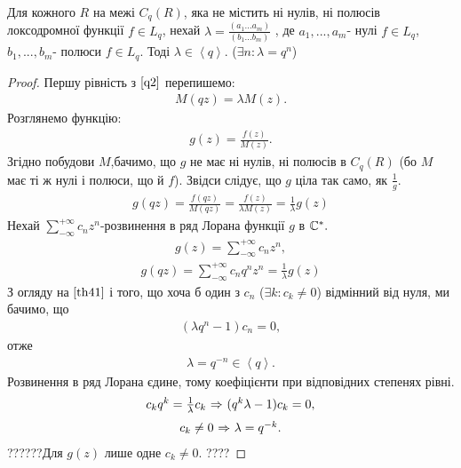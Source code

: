 \documentclass[12pt,a4paper]{article}
\begin{document}
\begin{thm}
Для кожного $R$ на межі $C_{q}(R)$, яка не містить ні нулів, ні полюсів локсодромної функції $f\in L_{q}$, нехай $\lambda=\frac{(a_{1}...a_{m})}{(b_{1}...b_{m})}$ , де $a_{1},...,a_{m}$- нулі $f\in L_{q}$, $b_{1},...,b_{m}$- полюси $f\in L_{q}$. Тоді $\lambda\in \left \langle q \right \rangle$. ($ \exists n:\lambda =q^{n}$)
\end{thm}
\begin{proof}
Першу рівність з $\eqref{q2}$ перепишемо:
\[\begin{array}{l}
 M(qz)=\lambda M(z).
 \end{array}\]
 Розглянемо функцію:
 \[\begin{array}{l}
 g(z)=\frac{f(z)}{M(z)}.
  \end{array}\]
  Згідно побудови $M$,бачимо, що $g$ не має ні нулів, ні полюсів в $C_{q}(R)$ (бо $M$ має ті ж нулі і полюси, що й $f$). Звідси слідує, що $g$ ціла так само, як $\frac{1}{g}$.
\begin{equation}\label{th41}
\begin{array}{l}
g(qz)=\frac{f(qz)}{M(qz)}=\frac{f(z)}{\lambda M(z)}=\frac{1}{\lambda}g(z)
\end{array}
\end{equation}
Нехай $\sum\limits_{-\infty}^{+\infty}c_{n}z^{n}$-розвинення в ряд Лорана функції $g$ в $\mathbb{C}^{*}.\\$
 \[\begin{array}{l}
g(z)=\sum\limits_{-\infty}^{+\infty}c_{n}z^{n},
 \end{array}\]
 \[\begin{array}{l}
 g(qz)=\sum\limits_{-\infty}^{+\infty}c_{n}q^{n}z^{n}=\frac{1}{\lambda}g(z)
  \end{array}\]
З огляду на $\eqref {th41} $ і того, що хоча б один з $c_{n}$ ($\exists k: c_{k}\neq 0$) відмінний від нуля, ми бачимо, що 
 \[\begin{array}{l}
 (\lambda q^{n}-1)c_{n}=0,
  \end{array}\]
  отже 
 \[\begin{array}{l} 
 \lambda= q^{-n}\in \left \langle q \right \rangle .
 \end{array}\]
Розвинення в ряд Лорана єдине, тому коефіцієнти при відповідних степенях рівні.
\[\begin{array}{l}
c_{k}q^{k}=\frac{1}{\lambda} c_{k}$ $\Rightarrow$ $(q^{k}\lambda -1)c_{k}=0,
 \end{array}\]
\[\begin{array}{l}
c_{k}\neq 0$ $\Rightarrow$  $\lambda=q^{-k}.
 \end{array}\]
??????Для $g(z)$ лише одне $ c_{k}\neq 0$. ????
\end{proof}
\[\begin{array}{l}
\end{array} \]
\end{document}
